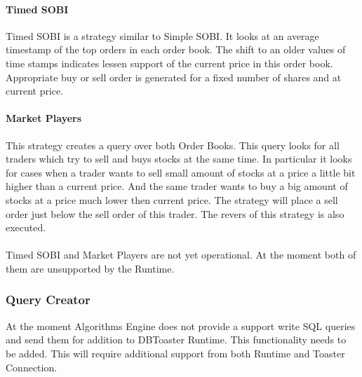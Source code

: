 \documentclass[14pt]{article}
\begin{document}
\paragraph{Timed SOBI}

Timed SOBI is a strategy similar to Simple SOBI. It looks at an average timestamp of the top orders in each order book. The shift to an older values of time stamps indicates lessen support of the current price in this order book. Appropriate buy or sell order is generated for a fixed number of shares and at current price. 

\paragraph{Market Players} 

This strategy creates a query over both Order Books. This query looks for all traders which try to sell and buys stocks at the same time. In particular it looks for cases when a trader wants to sell small amount of stocks at a price a little bit higher than a current price. And the same trader wants to buy a big amount of stocks at a price much lower then current price. The strategy will place a sell order just below the sell order of this trader. The revers of this strategy is also executed.
\\
\\
Timed SOBI and Market Players are not yet operational. At the moment both of them are unsupported by the Runtime.


\subsubsection{Query Creator}

At the moment Algorithms Engine does not provide a support write SQL queries and send them for addition to DBToaster Runtime. This functionality needs to be added. This will require additional support from both Runtime and Toaster Connection.

\end{document}
